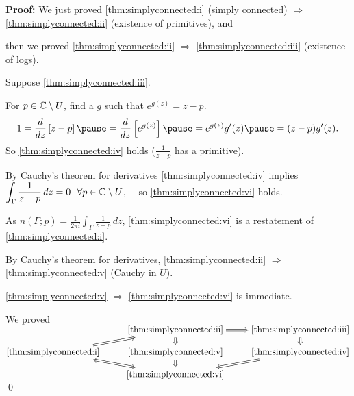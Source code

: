 \documentclass[10pt,aspectratio=169]{beamer}
\begin{document}
\begin{frame}[fragile]

\textbf{Proof:}
We just proved
\eqref{thm:simplyconnected:i} (simply connected) $\Rightarrow$
\eqref{thm:simplyconnected:ii} (existence of primitives),
and

\pause
then we proved \eqref{thm:simplyconnected:ii} $\Rightarrow$ \eqref{thm:simplyconnected:iii}
(existence of logs).

\medskip
\pause

Suppose \eqref{thm:simplyconnected:iii}. \pause

For $p \in {\mathbb{C}} \setminus U$, find a $g$ such that
$e^{g(z)} = z-p$.\pause
\[
1 = 
\frac{d}{dz} \left[
z-p
\right]
\pause
=
\frac{d}{dz} \left[
e^{g(z)}
\right]
\pause
=
e^{g(z)} g'(z)
\pause
=
(z-p) g'(z) .
\]
\pause
So \eqref{thm:simplyconnected:iv} holds ($\frac{1}{z-p}$ has a primitive).

\pause

By Cauchy's theorem for derivatives
\eqref{thm:simplyconnected:iv} implies
$\displaystyle
\int_\Gamma \frac{1}{z-p} \, dz = 0 
\ \  \forall p \in {\mathbb{C}} \setminus U$,
\pause \ \ so \eqref{thm:simplyconnected:vi} holds.

\pause

As 
$\displaystyle
n(\Gamma;p) = 
\frac{1}{2\pi i}
\int_\Gamma \frac{1}{z-p} \, dz$,
\eqref{thm:simplyconnected:vi} is a restatement of
\eqref{thm:simplyconnected:i}.

\medskip
\pause

By Cauchy's theorem for derivatives,
\eqref{thm:simplyconnected:ii} $\Rightarrow$
\eqref{thm:simplyconnected:v} (Cauchy in $U$).

\medskip
\pause

\eqref{thm:simplyconnected:v} $\Rightarrow$ \eqref{thm:simplyconnected:vi} is immediate.

\pause
\medskip

We proved
$
\begin{tikzcd}[cramped, row sep=small]
& \text{\eqref{thm:simplyconnected:ii}} \arrow[d, Rightarrow] \arrow[r, Rightarrow] &
\text{\eqref{thm:simplyconnected:iii}} \arrow[d, Rightarrow] \\
\text{\eqref{thm:simplyconnected:i}} \arrow[ur, Rightarrow] & 
\text{\eqref{thm:simplyconnected:v}} \arrow[d, Rightarrow] &
\text{\eqref{thm:simplyconnected:iv}} \arrow[dl, Rightarrow] \\
& \text{\eqref{thm:simplyconnected:vi}} \arrow[ul, Leftrightarrow] &
\end{tikzcd}
$
\qed

\end{frame}
\end{document}
